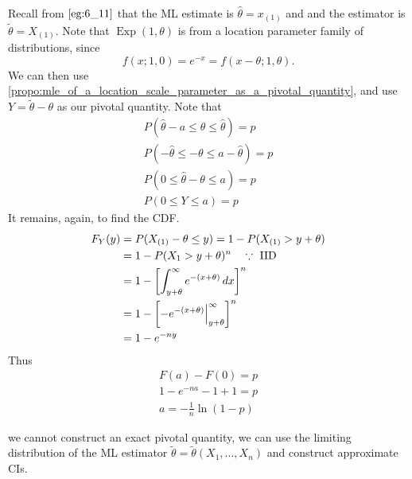 \documentclass[notoc,notitlepage]{tufte-book}
\DeclareMathOperator{\Exp}{Exp }
\begin{document}
\begin{solution}
  Recall from $\cref{eg:6_11}$ that the ML estimate is $\hat{\theta} = x_{(1)}$ and and the estimator is $\tilde{\theta} = X_{(1)}$. Note that $\Exp(1, \theta)$ is from a location parameter family of distributions, since
  \begin{equation*}
    f(x; 1, 0) = e^{-x} = f(x - \theta; 1, \theta).
  \end{equation*}
  We can then use \cref{propo:mle_of_a_location_scale_parameter_as_a_pivotal_quantity}, and use $Y = \tilde{\theta} - \theta$ as our pivotal quantity. Note that
  \begin{gather*}
    P\left( \hat{\theta} - a \leq \theta \leq \hat{\theta} \right) = p \\
    P( - \hat{\theta} \leq - \theta \leq a - \hat{\theta} ) = p \\
    P( 0 \leq \hat{\theta} - \theta \leq a ) = p \\
    P( 0 \leq Y \leq a ) = p
  \end{gather*}
  It remains, again, to find the CDF.
  \begin{align*}
    F_Y(y) &= P(X_{(1)} - \theta \leq y) = 1 - P(X_{(1)} > y + \theta) \\
           &= 1 - P(X_1 > y + \theta)^n \quad \because \text{ IID } \\
           &= 1 - \left[ \int_{y + \theta}^{\infty}e^{-(x + \theta)} \mathop{}\!d{x} \right]^n \\
           &= 1 - \left[ - e^{-(x + \theta)} \Big|_{y + \theta}^{\infty} \right]^n \\
           &= 1 - e^{-ny}
  \end{align*}
  Thus
  \begin{gather*}
    F(a) - F(0) = p \\
    1 - e^{-na} - 1 + 1 = p \\
    a = - \frac{1}{n} \ln (1 - p)
  \end{gather*}
\end{solution}

 we cannot construct an exact pivotal quantity, we can use the limiting distribution of the ML estimator $\tilde{\theta} = \tilde{\theta}(X_1, ..., X_n)$ and construct approximate CIs.
\end{document}
